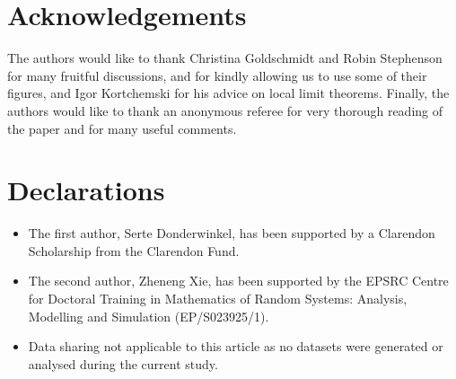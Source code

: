 \section*{Acknowledgements}
The authors would like to thank Christina Goldschmidt and Robin Stephenson for many fruitful discussions, and for kindly allowing us to use some of their figures, and Igor Kortchemski for his advice on local limit theorems. Finally, the authors would like to thank an anonymous referee for very thorough reading of the paper and for many useful comments.

\section*{Declarations}

\begin{itemize}
    \item The first author, Serte Donderwinkel, has been supported by a Clarendon Scholarship from the Clarendon Fund.
    \item The second author, Zheneng Xie, has been supported by the EPSRC Centre for Doctoral Training in Mathematics of Random Systems: Analysis, Modelling and Simulation (EP/S023925/1).
    \item  Data sharing not applicable to this article as no datasets were generated or analysed during the current study.
\end{itemize}
